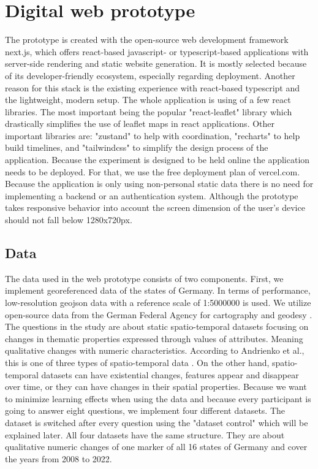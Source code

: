 \chapter{Digital web prototype}
The prototype is created with the open-source web development framework next.js, which offers react-based javascript- or
typescript-based applications with server-side rendering and static website generation. It is mostly selected because of its
developer-friendly ecosystem, especially regarding deployment. Another reason for this stack is the existing experience
with react-based typescript and the lightweight, modern setup. The whole application is using of a few react libraries.
The most important being the popular "react-leaflet" library which drastically simplifies the use of leaflet maps in react
applications. Other important libraries are: "zustand" to help with coordination, "recharts" to help build timelines, and
"tailwindcss" to simplify the design process of the application. Because the experiment is designed to be held online the
application needs to be deployed. For that, we use the free deployment plan of vercel.com. Because the application is only
using non-personal static data there is no need for implementing a backend or an authentication system. Although the prototype
takes responsive behavior into account the screen dimension of the user's device should not fall below 1280x720px. 
\section{Data}
The data used in the web prototype consists of two components. First, we implement georeferenced data of the states of Germany. In terms of
performance, low-resolution geojson data with a reference scale of 1:5000000 is used. We utilize open-source data
from the German Federal Agency for cartography and geodesy \citep*{gdz.bkg}. The questions in the study are about static
spatio-temporal datasets focusing on changes in thematic properties expressed through values of attributes. Meaning
qualitative changes with numeric characteristics. According to Andrienko et al., this is one of three types of spatio-temporal
data \citep*{Andrienko.2003}. On the other hand, spatio-temporal datasets can have existential changes, features appear and
disappear over time, or they can have changes in their spatial properties. Because we want to minimize learning effects
when using the data and because every participant is going to answer eight questions, we implement four different
datasets. The dataset is switched after every question using the "dataset control" which will be explained later. All four datasets
have the same structure. They are about qualitative numeric changes of one marker of all 16 states of Germany and cover
the years from 2008 to 2022.
